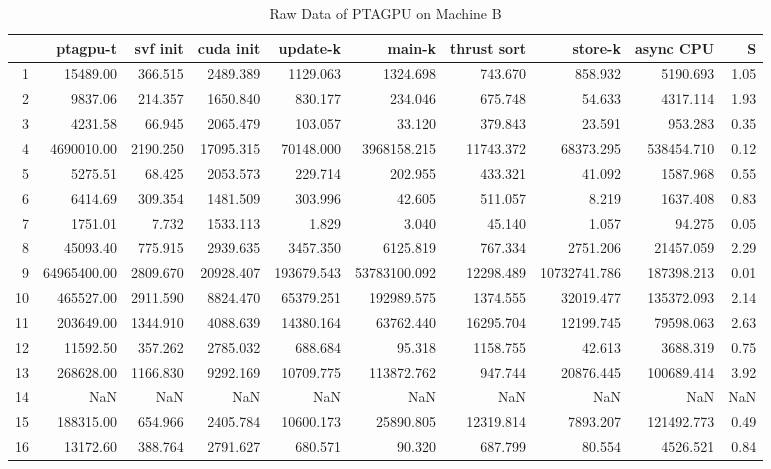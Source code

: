 \begin{table}[ht]
    \tiny
    \begin{tabular}{rrrrrrrrrr}
        \toprule
           & ptagpu-t    & svf init & cuda init & update-k   & main-k       & thrust sort & store-k      & async CPU  & S    \\
        \midrule
        1  & 15489.00    & 366.515  & 2489.389  & 1129.063   & 1324.698     & 743.670     & 858.932      & 5190.693   & 1.05 \\
        2  & 9837.06     & 214.357  & 1650.840  & 830.177    & 234.046      & 675.748     & 54.633       & 4317.114   & 1.93 \\
        3  & 4231.58     & 66.945   & 2065.479  & 103.057    & 33.120       & 379.843     & 23.591       & 953.283    & 0.35 \\
        4  & 4690010.00  & 2190.250 & 17095.315 & 70148.000  & 3968158.215  & 11743.372   & 68373.295    & 538454.710 & 0.12 \\
        5  & 5275.51     & 68.425   & 2053.573  & 229.714    & 202.955      & 433.321     & 41.092       & 1587.968   & 0.55 \\
        6  & 6414.69     & 309.354  & 1481.509  & 303.996    & 42.605       & 511.057     & 8.219        & 1637.408   & 0.83 \\
        7  & 1751.01     & 7.732    & 1533.113  & 1.829      & 3.040        & 45.140      & 1.057        & 94.275     & 0.05 \\
        8  & 45093.40    & 775.915  & 2939.635  & 3457.350   & 6125.819     & 767.334     & 2751.206     & 21457.059  & 2.29 \\
        9  & 64965400.00 & 2809.670 & 20928.407 & 193679.543 & 53783100.092 & 12298.489   & 10732741.786 & 187398.213 & 0.01 \\
        10 & 465527.00   & 2911.590 & 8824.470  & 65379.251  & 192989.575   & 1374.555    & 32019.477    & 135372.093 & 2.14 \\
        11 & 203649.00   & 1344.910 & 4088.639  & 14380.164  & 63762.440    & 16295.704   & 12199.745    & 79598.063  & 2.63 \\
        12 & 11592.50    & 357.262  & 2785.032  & 688.684    & 95.318       & 1158.755    & 42.613       & 3688.319   & 0.75 \\
        13 & 268628.00   & 1166.830 & 9292.169  & 10709.775  & 113872.762   & 947.744     & 20876.445    & 100689.414 & 3.92 \\
        14 & NaN         & NaN      & NaN       & NaN        & NaN          & NaN         & NaN          & NaN        & NaN  \\
        15 & 188315.00   & 654.966  & 2405.784  & 10600.173  & 25890.805    & 12319.814   & 7893.207     & 121492.773 & 0.49 \\
        16 & 13172.60    & 388.764  & 2791.627  & 680.571    & 90.320       & 687.799     & 80.554       & 4526.521   & 0.84 \\
        \bottomrule
    \end{tabular}
    \caption{Raw Data of PTAGPU on Machine B}
\end{table}

